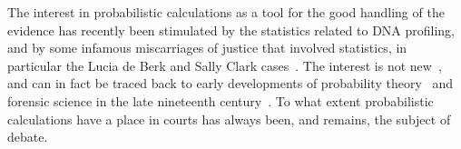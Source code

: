 \documentclass[10pt]{article}
\begin{document}
%
%
%



The interest in probabilistic calculations as a tool for the good handling of the evidence has recently been stimulated by the statistics related to DNA profiling, and by some infamous miscarriages of justice that involved statistics, in particular the Lucia de Berk and Sally Clark cases~\citep{dawidEtal2011,fenton2011,schnepsColmez2013}. The interest is not new~\citep{tillers2011}, and can in fact be traced back to early 
developments of probability theory~\citep{bernoulli1713, laplace1814} and forensic science in the late nineteenth century~\citep{taroniEtal1998}. To what extent probabilistic calculations have a place in courts has always been, and remains, the subject of debate.

\end{document}
